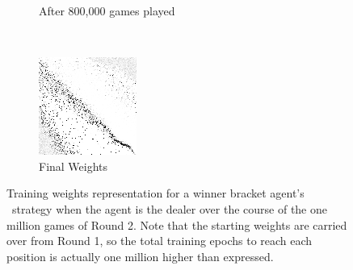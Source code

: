 \begin{figure}
\begin{subfigure}[t]{0.3\textwidth}
	\caption{After 800,000 games played}
	\end{subfigure}
	~
	\begin{subfigure}[t]{0.3\textwidth}
	\includegraphics[width=\textwidth]{images/findings/round2/flipbook/winner/checkpoint_999999.png}
	\caption{Final Weights}
	\end{subfigure}

\caption{
	Training weights representation for a winner bracket agent's \handmaxavg\
	strategy when the agent is the dealer
	over the course of the one million games of Round 2.
	Note that the starting weights are carried over from Round 1,
	so the total training epochs to reach each position is actually
	one million higher than expressed.
}
\label{fig:r2-flip-winner}
\end{figure}
